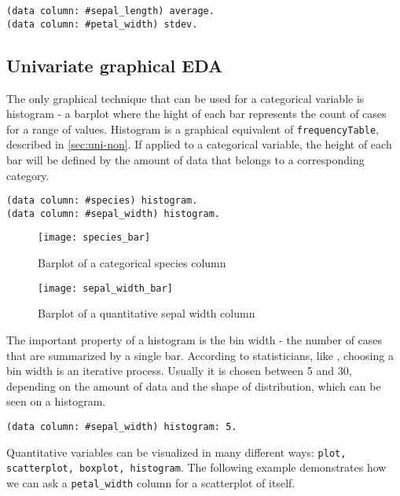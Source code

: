 \documentclass[sigplan]{acmart}
\begin{document}
\begin{lstlisting}[basicstyle=\small,language=Smalltalk]
(data column: #sepal_length) average. 
(data column: #petal_width) stdev.
\end{lstlisting}

\subsection{Univariate graphical EDA}
\label{sec:uni-graph}

The only graphical technique that can be used for a categorical variable is histogram - a barplot where the hight of each bar represents the count of cases for a range of values. Histogram is a graphical equivalent of \texttt{frequencyTable}, described in \ref{sec:uni-non}. If applied to a categorical variable, the height of each bar will be defined by the amount of data that belongs to a corresponding category.

\begin{lstlisting}[basicstyle=\small,language=Smalltalk]
(data column: #species) histogram.
(data column: #sepal_width) histogram.
\end{lstlisting}

\begin{figure}[H]
  \begin{center}
  \texttt{[image: species\_bar]}
  \caption{Barplot of a categorical species column}
  \end{center}
  \begin{center}
  \texttt{[image: sepal\_width\_bar]}
  \caption{Barplot of a quantitative sepal width column}
  \end{center}
\end{figure}

The important property of a histogram is the bin width - the number of cases that are summarized by a single bar. According to statisticians, like \cite{Seltman}, choosing a bin width is an iterative process. Usually it is chosen between 5 and 30, depending on the amount of data and the shape of distribution, which can be seen on a histogram.

\begin{lstlisting}[basicstyle=\small,language=Smalltalk]
(data column: #sepal_width) histogram: 5.
\end{lstlisting}

Quantitative variables can be visualized in many different ways: \texttt{plot, scatterplot, boxplot, histogram}. The following example demonstrates how we can ask a \texttt{petal\_width} column for a scatterplot of itself.
 
\end{document}
